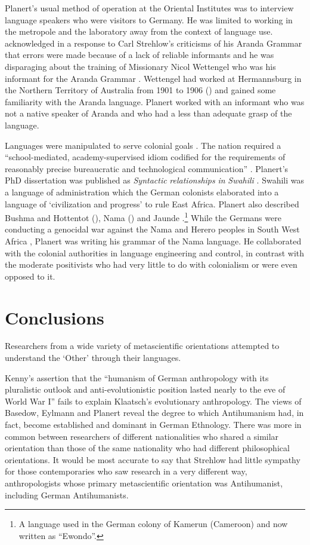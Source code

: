\documentclass[english,output=paper,colorlinks,citecolor=brown]{../langscibook}
\begin{document}
Planert’s usual method of operation at the Oriental Institutes was to interview language speakers who were visitors to Germany. He was limited to working in the metropole and the laboratory away from the context of language use. \citet{Planert1908} acknowledged in a response to Carl Strehlow’s criticisms of his Aranda Grammar that errors were made because of a lack of reliable informants and he was disparaging about the training of Missionary Nicol Wettengel who was his informant for the Aranda Grammar \citep{Planert1907Aranda}.  Wettengel had worked at Hermannsburg in the Northern Territory of Australia from 1901 to 1906 (\citealt[1154]{Strehlow2011}) and gained some familiarity with the Aranda language. Planert worked with an informant who was not a native speaker of Aranda and who had a less than adequate grasp of the language. 

Languages were manipulated to serve colonial goals \citep[88]{Errington2008}. The nation required a “school-mediated, academy-supervised idiom codified for the requirements of reasonably precise bureaucratic and technological communication” \citep[57]{Gellner1983}. Planert’s PhD dissertation was published as \textit{Syntactic} \textit{relationships} \textit{in} \textit{Swahili} \citep{Planert1907Suaheli}. Swahili was a language of administration which the German colonists elaborated into a language of ‘civilization and progress’ to rule East Africa. Planert also described Bushma and Hottentot (\citeyear{Planert1905}), Nama (\citeyear{Planert1905}) and Jaunde \citep{Nekes1911}.\footnote{A language used in the German colony of Kamerun (Cameroon) and now written as ``Ewondo''.} While the Germans were conducting a genocidal war against the Nama and Herero peoples in South West Africa \citep{Hull2005}, Planert was writing his grammar of the Nama language. He collaborated with the colonial authorities in language engineering and control, in contrast with the moderate positivists who had very little to do with colonialism or were even opposed to it.

\section{Conclusions} 

Researchers from a wide variety of metascientific orientations attempted to understand the ‘Other’ through their languages. 

Kenny’s assertion that the ``humanism of German anthropology with its pluralistic outlook and anti-evolutionistic position lasted nearly to the eve of World War I'' fails to explain Klaatsch’s evolutionary anthropology. The views of Basedow, Eylmann and Planert reveal the degree to which Antihumanism had, in fact, become established and dominant in German Ethnology. There was more in common between researchers of different nationalities who shared a similar orientation than those of the same nationality who had different philosophical orientations.  It would be most accurate to say that Strehlow had little sympathy for those contemporaries who saw research in a very different way, anthropologists whose primary metascientific orientation was Antihumanist, including German Antihumanists.
\end{document}
